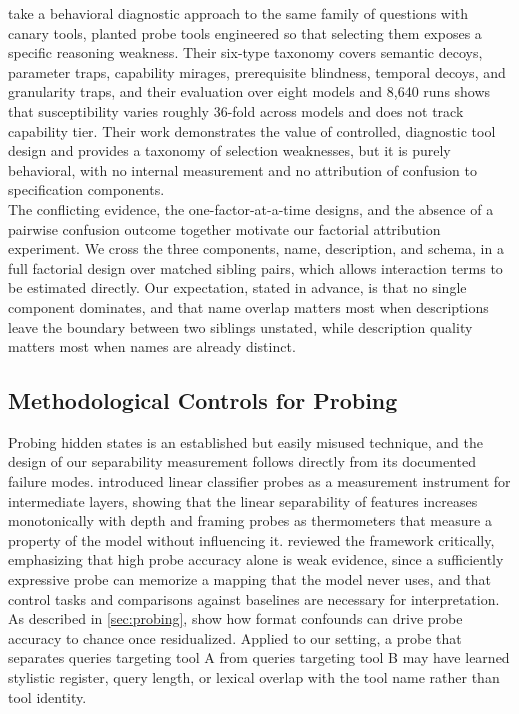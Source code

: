 \textcite{anand2026canary} take a behavioral diagnostic approach to the same family of questions with canary tools, planted probe tools engineered so that selecting them exposes a specific reasoning weakness.
Their six-type taxonomy covers semantic decoys, parameter traps, capability mirages, prerequisite blindness, temporal decoys, and granularity traps, and their evaluation over eight models and 8,640 runs shows that susceptibility varies roughly 36-fold across models and does not track capability tier.
Their work demonstrates the value of controlled, diagnostic tool design and provides a taxonomy of selection weaknesses, but it is purely behavioral, with no internal measurement and no attribution of confusion to specification components.
\\

The conflicting evidence, the one-factor-at-a-time designs, and the absence of a pairwise confusion outcome together motivate our factorial attribution experiment.
We cross the three components, name, description, and schema, in a full factorial design over matched sibling pairs, which allows interaction terms to be estimated directly.
Our expectation, stated in advance, is that no single component dominates, and that name overlap matters most when descriptions leave the boundary between two siblings unstated, while description quality matters most when names are already distinct.

\subsection{Methodological Controls for Probing}

Probing hidden states is an established but easily misused technique, and the design of our separability measurement follows directly from its documented failure modes.
\textcite{alain2016understanding} introduced linear classifier probes as a measurement instrument for intermediate layers, showing that the linear separability of features increases monotonically with depth and framing probes as thermometers that measure a property of the model without influencing it.
\textcite{belinkov2022probing} reviewed the framework critically, emphasizing that high probe accuracy alone is weak evidence, since a sufficiently expressive probe can memorize a mapping that the model never uses, and that control tasks and comparisons against baselines are necessary for interpretation.
\\

As described in \cref{sec:probing}, \textcite{sahoo2026linear} show how format confounds can drive probe accuracy to chance once residualized.
Applied to our setting, a probe that separates queries targeting tool A from queries targeting tool B may have learned stylistic register, query length, or lexical overlap with the tool name rather than tool identity.
\\

